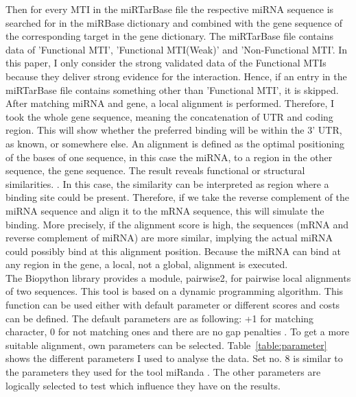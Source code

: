 \documentclass[12pt,  a4paper]{report}
\begin{document}
Then for every MTI in the miRTarBase file the respective miRNA sequence is searched for in the miRBase dictionary and combined with the gene sequence of the corresponding target in the gene dictionary. The miRTarBase file contains data of 'Functional MTI', 'Functional MTI(Weak)' and 'Non-Functional MTI'. In this paper, I only consider the strong validated data of the Functional MTIs because they deliver strong evidence for the interaction. Hence, if an entry in the miRTarBase file contains something other than 'Functional MTI', it is skipped. \\

After matching miRNA and gene, a local alignment is performed. Therefore, I took the whole gene sequence, meaning the concatenation of UTR and coding region. This will show whether the preferred binding will be within the 3' UTR, as known, or somewhere else. An alignment is defined as the optimal positioning of the bases of one sequence, in this case the miRNA, to a region in the other sequence, the gene sequence. The result reveals functional or structural similarities. \cite{alignment}. In this case, the similarity can be interpreted as region where a binding site could be present. Therefore, if we take the reverse complement of the miRNA sequence and align it to the mRNA sequence, this will simulate the binding. More precisely, if the alignment score is high, the sequences (mRNA and reverse complement of miRNA) are more similar, implying the actual miRNA could possibly bind at this alignment position. Because the miRNA can bind at any region in the gene, a local, not a global, alignment is executed.\\

The Biopython library provides a module, pairwise2, for pairwise local alignments of two sequences. This tool is based on a dynamic programming algorithm. This function can be used either with default parameter or different scores and costs can be defined. The default parameters are as following: +1 for matching character, 0 for not matching ones and there are no gap penalties \cite{pairwise}. To get a more suitable alignment, own parameters can be selected. Table~\ref{table:parameter} shows the different parameters I used to analyse the data. Set no. 8 is similar to the parameters they used for the tool miRanda \cite{Enright}. The other parameters are logically selected to test which influence they have on the results. \\
\end{document}
